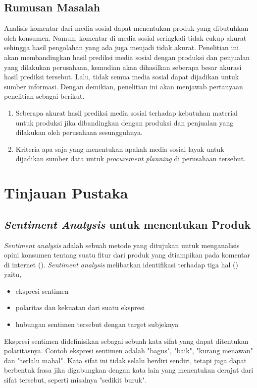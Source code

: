 \documentclass[]{article}
\begin{document}
\begin{spacing}{1.5}
\subsection{Rumusan Masalah}
Analisis komentar dari media sosial dapat menentukan produk yang dibutuhkan oleh konsumen. Namun,
komentar di media sosial seringkali tidak cukup akurat sehingga hasil pengolahan yang ada juga
menjadi tidak akurat. Penelitian ini akan membandingkan hasil prediksi media sosial dengan produksi
dan penjualan yang dilakukan perusahaan, kemudian akan dihasilkan seberapa besar akurasi hasil 
prediksi tersebut. Lalu, tidak semua media sosial dapat dijadikan untuk sumber informasi.
Dengan demikian, penelitian ini akan menjawab pertanyaan penelitian sebagai berikut.
\begin{enumerate}
    \item Seberapa akurat hasil prediksi media sosial terhadap kebutuhan material untuk produksi jika
        dibandingkan dengan produksi dan penjualan yang dilakukan oleh perusahaan sesungguhnya.
    \item Kriteria apa saja yang menentukan apakah media sosial layak untuk dijadikan sumber data untuk 
        \textit{procurement planning} di perusahaan 
        tersebut.
\end{enumerate}
\newpage

\section{Tinjauan Pustaka}
\subsection{\textit{Sentiment Analysis} untuk menentukan Produk}
\textit{Sentiment analysis} adalah sebuah metode yang ditujukan untuk menganalisis opini konsumen tentang
suatu fitur dari produk yang dtiampikan pada komentar di internet (\cite{Lau201480}). 
\textit{Sentiment analysis} melibatkan identifikasi terhadap tiga hal (\cite{Nas2003}) yaitu,
\begin{itemize}
    \item ekspresi sentimen
    \item polaritas dan kekuatan dari suatu ekspresi
    \item hubungan sentimen tersebut dengan target subjeknya
\end{itemize}
Ekspresi sentimen didefinisikan sebagai sebuah kata sifat yang dapat ditentukan polaritasnya. Contoh ekspresi
sentimen adalah "bagus", "baik", "kurang menawan" dan "terlalu mahal". Kata sifat ini tidak selalu berdiri
sendiri, tetapi juga dapat berbentuk frasa jika digabungkan dengan kata lain yang menentukan derajat dari
sifat tersebut, seperti misalnya "sedikit buruk".


\end{spacing}
\end{document}
